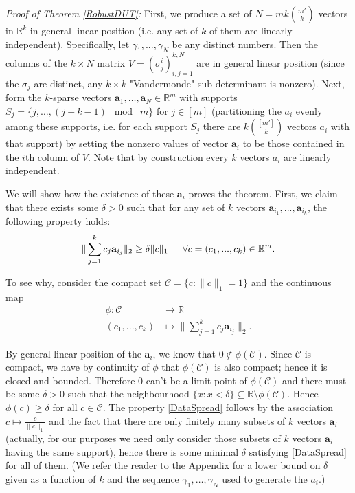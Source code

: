 \documentclass[journal,onecolumn]{IEEEtran}
\begin{document}
\emph{Proof of Theorem \ref{RobustDUT}:} First, we produce a set of $N = mk{m' \choose k}$ vectors in $\mathbb{R}^k$ in general linear position (i.e. any set of $k$ of them are linearly independent). Specifically, let $\gamma_1, ..., \gamma_N$ be any distinct numbers. Then the columns of the $k \times N$ matrix $V = (\sigma^i_j)^{k,N}_{i,j=1}$ are in general linear position (since the $\sigma_j$ are distinct, any $k \times k$ "Vandermonde" sub-determinant is nonzero). Next, form the $k$-sparse vectors $\mathbf{a}_1, \ldots, \mathbf{a}_N \in \mathbb{R}^m$ with supports $S_j = \{j, \ldots, (j + k-1)\;\bmod\; m \}$ for $j \in [m]$ (partitioning the $a_i$ evenly among these supports, i.e. for each support $S_j$ there are $k{[m'] \choose k}$ vectors $a_i$ with that support) by setting the nonzero values of vector $\mathbf{a}_i$ to be those contained in the $i$th column of $V$. Note that by construction every $k$ vectors $a_i$ are linearly independent. 

We will show how the existence of these $\mathbf{a}_i$ proves the theorem. First, we claim that there exists some $\delta > 0$ such that for any set of $k$ vectors $\mathbf{a}_{i_1}, ..., \mathbf{a}_{i_k}$, the following property holds:
\begin{align}\label{DataSpread}
\|\sum_{j = 1}^k c_j \mathbf{a}_{i_j}\|_2 \geq \delta \|c\|_1 \indent \forall c = (c_1, ..., c_k) \in \mathbb{R}^m.
\end{align}

To see why, consider the compact set $\mathcal{C} = \{c: \|c\|_1 = 1\}$ and the continuous map
\begin{align*}
\phi: \mathcal{C} &\to \mathbb{R} \\
(c_1, ..., c_k) &\mapsto \|\sum_{j = 1}^k c_j \mathbf{a}_{i_j}\|_2.
\end{align*}

By general linear position of the $\mathbf{a}_i$, we know that $0 \notin \phi(\mathcal{C})$. Since $\mathcal{C}$ is compact, we have by continuity of $\phi$ that $\phi(\mathcal{C})$ is also compact; hence it is closed and bounded. Therefore $0$ can't be a limit point of $\phi(\mathcal{C})$ and there must be some $\delta > 0$ such that the neighbourhood $\{x: x < \delta\} \subseteq \mathbb{R} \setminus \phi(\mathcal{C})$. Hence $\phi(c) \geq \delta$ for all $c \in \mathcal{C}$. The property \eqref{DataSpread} follows by the association $c \mapsto \frac{c}{\|c\|_1}$ and the fact that there are only finitely many subsets of $k$ vectors $\mathbf{a}_i$ (actually, for our purposes we need only consider those subsets of $k$ vectors $\mathbf{a}_i$ having the same support), hence there is some minimal $\delta$ satisfying \eqref{DataSpread} for all of them. (We refer the reader to the Appendix for a lower bound on $\delta$ given as a function of $k$ and the sequence $\gamma_1, \ldots, \gamma_N$ used to generate the $a_i$.)
\end{document}
